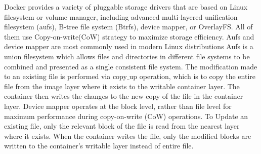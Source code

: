 Docker provides a variety of pluggable storage drivers that are based on Linux filesystem or volume manager, including advanced multi-layered unification filesystem (aufs), B-tree file system (Btrfs), device mapper, or OverlayFS.
%
All of them use Copy-on-write(CoW) strategy to maximize storage efficiency.
%
Aufs and device mapper are most commonly used in modern Linux distributions
%
%
Aufs is a union filesystem which allows files and directories in different file systems to be combined and presented as a single consistent file system. 
The modification made to an existing file is performed via copy$\_$up operation, which is to copy the entire file from the image layer where it exists to the writable container layer. The container then writes the changes to the new copy of the file in the container layer. Device mapper operates at the block level, rather than file level for maximum performance during copy-on-write (CoW) operations. To Update an existing file, only the relevant block of the file is read from the nearest layer where it exists. When the container writes the file, only the modified blocks are written to the container's writable layer instead of entire file.
%
%





